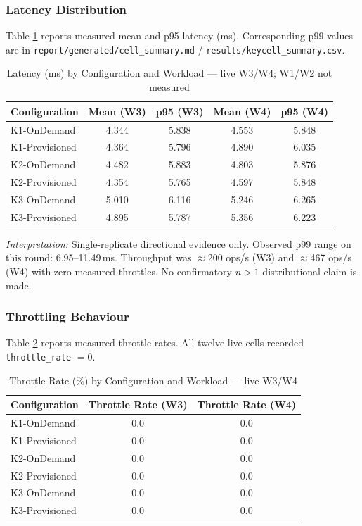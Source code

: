 \subsubsection{Latency Distribution}

Table \ref{tab:sim-latency} reports measured mean and p95 latency (ms). Corresponding p99 values are in \texttt{report/generated/cell\_summary.md} / \texttt{results/keycell\_summary.csv}.

\begin{table}[h]
\centering
\caption{Latency (ms) by Configuration and Workload --- live W3/W4; W1/W2 not measured}
\label{tab:sim-latency}
\begin{tabular}{|l|c|c|c|c|}
\hline
\textbf{Configuration} & \textbf{Mean (W3)} & \textbf{p95 (W3)} & \textbf{Mean (W4)} & \textbf{p95 (W4)} \\ \hline
K1-OnDemand & 4.344 & 5.838 & 4.553 & 5.848 \\ \hline
K1-Provisioned & 4.364 & 5.796 & 4.890 & 6.035 \\ \hline
K2-OnDemand & 4.482 & 5.883 & 4.803 & 5.876 \\ \hline
K2-Provisioned & 4.354 & 5.765 & 4.597 & 5.848 \\ \hline
K3-OnDemand & 5.010 & 6.116 & 5.246 & 6.265 \\ \hline
K3-Provisioned & 4.895 & 5.787 & 5.356 & 6.223 \\ \hline
\end{tabular}
\end{table}

\textit{Interpretation:} Single-replicate directional evidence only. Observed p99 range on this round: 6.95--11.49\,ms. Throughput was $\approx$200 ops/s (W3) and $\approx$467 ops/s (W4) with zero measured throttles. No confirmatory $n{>}1$ distributional claim is made.

\subsubsection{Throttling Behaviour}

Table \ref{tab:sim-throttle} reports measured throttle rates. All twelve live cells recorded \texttt{throttle\_rate} $= 0$.

\begin{table}[h]
\centering
\caption{Throttle Rate (\%) by Configuration and Workload --- live W3/W4}
\label{tab:sim-throttle}
\begin{tabular}{|l|c|c|}
\hline
\textbf{Configuration} & \textbf{Throttle Rate (W3)} & \textbf{Throttle Rate (W4)} \\ \hline
K1-OnDemand & 0.0 & 0.0 \\ \hline
K1-Provisioned & 0.0 & 0.0 \\ \hline
K2-OnDemand & 0.0 & 0.0 \\ \hline
K2-Provisioned & 0.0 & 0.0 \\ \hline
K3-OnDemand & 0.0 & 0.0 \\ \hline
K3-Provisioned & 0.0 & 0.0 \\ \hline
\end{tabular}
\end{table}

